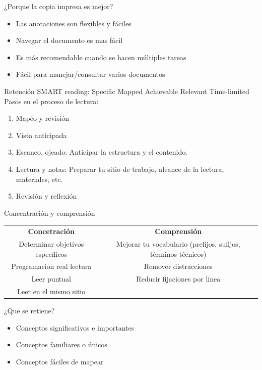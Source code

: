 \documentclass[
10pt,
aspectratio=169,
]{beamer}
\begin{document}
\begin{frame}[c]{¿Porque la copia impresa es mejor?}
\begin{itemize}
\item Las anotaciones son flexibles y f\'aciles
\item Navegar el documento es mas f\'acil
\item Es m\'as recomendable cuando se hacen m\'ultiples tareas
\item F\'acil para manejar/consultar varios documentos
\end{itemize}
\end{frame}

\begin{frame}[c]{Retenci\'on}
\alert{SMART} reading:
\alert{S}pecific \alert{M}apped \alert{A}chievable  \alert{R}elevant \alert{T}ime-limited 
Pasos en el proceso de lectura:
\begin{enumerate}
\item Map\'eo y revisi\'on
\item Vista anticipada
\item Escaneo, ojeado: Anticipar la estructura y el contenido.
\item Lectura y notas: Preparar tu sitio de trabajo, alcance de la lectura, materiales, etc.
\item Revisi\'on y reflexi\'on
\end{enumerate}
\end{frame}


\begin{frame}[c]{Concentraci\'on y comprensi\'on}
\begin{table}
\begin{adjustbox}{width=\textwidth}
\begin{tabular}{ c c }
\textbf{Concetraci\'on} & \textbf{Comprensi\'on}\\
Determinar objetivos espec\'ificos & Mejorar tu vocabulario (prefijos, sufijos, t\'erminos t\'ecnicos) \\
Programacion real lectura & Remover distracciones \\
Leer puntual & Reducir fijaciones por linea \\
Leer en el mismo sitio & 
\end{tabular}
\end{adjustbox}
\end{table}
¿Que se retiene?
\begin{itemize}
\item Conceptos significativos e importantes
\item Conceptos familiares o \'unicos
\item Conceptos f\'aciles de mapear
\end{itemize}
\end{frame}
\end{document}

